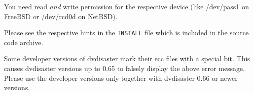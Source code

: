 { You need read {\em and} write permission for the respective device
  (like /dev/pass1 on FreeBSD or /dev/rcd0d on NetBSD). 

  Please see the respective hints in the {\tt INSTALL} file which is
  included in the source code archive.}

      {Some developer versions of dvdisaster mark their ecc files with a special bit.
        This causes dvdisaster versions up to 0.65 to falsely display the above error
        message. Please use the developer versions only together with dvdisaster
        0.66 or newer versions. }
